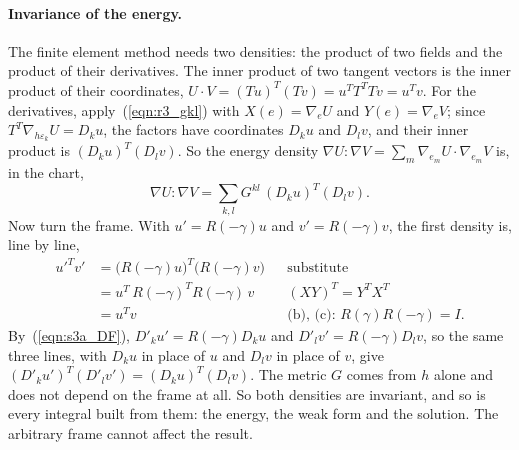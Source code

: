 \paragraph{Invariance of the energy.} The finite element method needs two densities: the product of two fields and the product of their derivatives. The inner product of two tangent vectors is the inner product of their coordinates, $U\cdot V = (Tu)^T(Tv) = u^TT^TTv = u^Tv$. For the derivatives, apply~(\ref{eqn:r3_gkl}) with $X(e) = \nabla_e U$ and $Y(e) = \nabla_e V$; since $T^T\nabla_{h\varepsilon_k} U = D_ku$, the factors have coordinates $D_ku$ and $D_lv$, and their inner product is $(D_ku)^T(D_lv)$. So the energy density $\nabla U : \nabla V = \sum_m \nabla_{e_m}U\cdot\nabla_{e_m}V$ is, in the chart,
\begin{equation}
\label{eqn:r3_density}
\nabla U : \nabla V = \sum_{k,l} G^{kl}\, (D_ku)^T(D_lv) .
\end{equation}
Now turn the frame. With $u' = R(-\gamma)u$ and $v' = R(-\gamma)v$, the first density is, line by line,
\begin{align*}
u'^Tv' &= \big(R(-\gamma)u\big)^T\big(R(-\gamma)v\big) && \text{substitute} \\
&= u^T\,R(-\gamma)^TR(-\gamma)\,v && (XY)^T = Y^TX^T \\
&= u^Tv && \text{(b), (c): } R(\gamma)R(-\gamma) = I .
\end{align*}
By~(\ref{eqn:s3a_DF}), $D'_ku' = R(-\gamma)D_ku$ and $D'_lv' = R(-\gamma)D_lv$, so the same three lines, with $D_ku$ in place of $u$ and $D_lv$ in place of $v$, give $(D'_ku')^T(D'_lv') = (D_ku)^T(D_lv)$. The metric $G$ comes from $h$ alone and does not depend on the frame at all. So both densities are invariant, and so is every integral built from them: the energy, the weak form and the solution. The arbitrary frame cannot affect the result.

